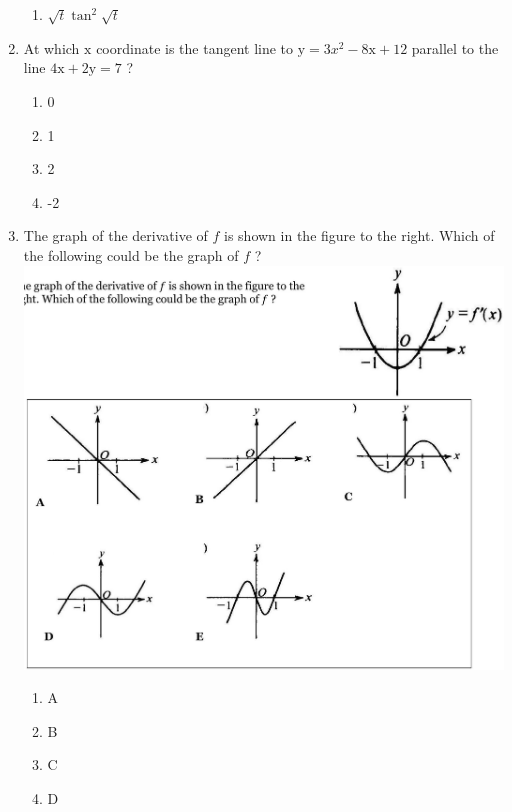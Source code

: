 \documentclass{article}
\begin{document}
\begin{enumerate}
\begin{minipage}[t]{\linewidth}
\begin{enumerate}
			\item \(\sqrt{t} \tan ^{2} \sqrt{t}\)
		\end{enumerate}
	\end{minipage}
	\item
	\begin{minipage}[t]{\linewidth}
		At which \(\mathrm{x}\) coordinate is the tangent line to
\(\mathrm{y}=3 x^{2}-8 \mathrm{x}+12\) parallel to the line
\(4 \mathrm{x}+2 \mathrm{y}=7\) ?
\vspace{1em}
		\begin{enumerate}
		\itemsep1em
			\item 0
			\item 1
			\item 2
			\item -2
		\end{enumerate}
	\end{minipage}
	\item
	\begin{minipage}[t]{\linewidth}
		The graph of the derivative of \(f\) is shown in the figure to the
right. Which of the following could be the graph of \(f\) ?
\includegraphics[width=5.493333333333333in]{media/d6fb84ff-4217-5798-98c3-0aef7c7c28ed.jpg}
\vspace{1em}
		\begin{enumerate}
		\itemsep1em
			\item A
			\item B
			\item C
			\item D

\end{enumerate}
\end{minipage}
\end{enumerate}
\end{document}
